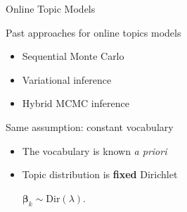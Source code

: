 \documentclass[compress]{beamer}
\newcommand{\dir}[1]{\mbox{Dir}(#1)}
\begin{document}




\begin{frame}{Online Topic Models}

\begin{block}{Past approaches for online topics models}
\begin{itemize}
\item Sequential Monte Carlo~\cite{canini-09}
\item Variational inference~\cite{hoffman-10}
\item Hybrid MCMC inference~\cite{mimno-12}
\end{itemize}
\end{block}

\begin{block}{Same assumption: constant vocabulary}
\begin{itemize}
\item The vocabulary is known \textit{a priori}
\item Topic distribution is {\bf fixed} Dirichlet \\
\begin{center}
$\boldsymbol{\beta}_k \sim \dir{\lambda}$.
\end{center}
\end{itemize}
\end{block}

\end{frame}
\end{document}
